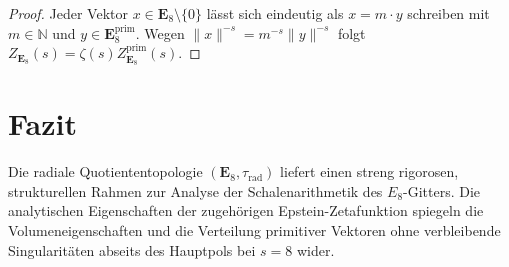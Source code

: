 \documentclass[11pt,a4paper]{article}
\begin{document}
	\begin{proof}
		Jeder Vektor $x \in \mathbf{E}_8 \setminus \{0\}$ lässt sich eindeutig als $x = m \cdot y$ schreiben mit $m \in \mathbb{N}$ und $y \in \mathbf{E}_8^{\text{prim}}$. Wegen $\|x\|^{-s} = m^{-s} \|y\|^{-s}$ folgt $Z_{\mathbf{E}_8}(s) = \zeta(s) Z_{\mathbf{E}_8}^{\text{prim}}(s)$.
	\end{proof}
	
	\section{Fazit}
	Die radiale Quotiententopologie $(\mathbf{E}_8, \tau_{\text{rad}})$ liefert einen streng rigorosen, strukturellen Rahmen zur Analyse der Schalenarithmetik des $E_8$-Gitters. Die analytischen Eigenschaften der zugehörigen Epstein-Zetafunktion spiegeln die Volumeneigenschaften und die Verteilung primitiver Vektoren ohne verbleibende Singularitäten abseits des Hauptpols bei $s=8$ wider.
	
\end{document}
